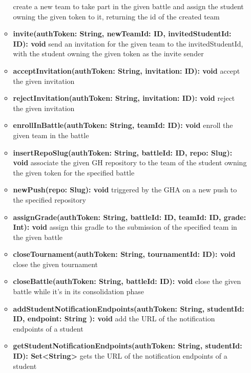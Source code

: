 \begin{itemize}
\begin{itemize}
                    create a new team to take part in the given battle and assign the student owning the given token
                    to it, returning the id of the created team
              \item \textbf{invite(authToken: String, newTeamId: ID, invitedStudentId: ID): void}
                    send an invitation for the given team to the invitedStudentId, with the student owning the given token
                    as the invite sender
              \item \textbf{acceptInvitation(authToken: String, invitation: ID): void}
                    accept the given invitation
              \item \textbf{rejectInvitation(authToken: String, invitation: ID): void}
                    reject the given invitation
              \item \textbf{enrollInBattle(authToken: String, teamId: ID): void}
                    enroll the given team in the battle
              \item \textbf{insertRepoSlug(authToken: String, battleId: ID, repo: Slug): void }
                    associate the given GH repository to the team of the student owning the given token for the
                    specified battle
              \item \textbf{newPush(repo: Slug): void }
                    triggered by the GHA on a new push to the specified repository
              \item \textbf{assignGrade(authToken: String, battleId: ID, teamId: ID, grade: Int): void }
                    assign this gradle to the submission of the specified team in the given battle
              \item \textbf{closeTournament(authToken: String, tournamentId: ID): void }
                    close the given tournament
              \item \textbf{closeBattle(authToken: String, battleId: ID): void }
                    close the given battle while it's in its consolidation phase
              \item \textbf{addStudentNotificationEndpoints(authToken: String, studentId: ID, endpoint: String ): void}
                    add the URL of the notification endpoints of a student
              \item \textbf{getStudentNotificationEndpoints(authToken: String, studentId: ID): Set<String>}
                    gets the URL of the notification endpoints of a student
          \end{itemize}

\end{itemize}
